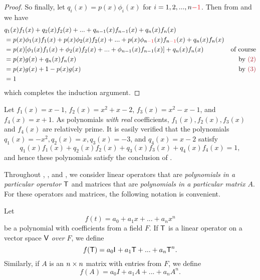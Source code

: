 \begin{proof}
So finally, let \(q_i(x) = p(x)\phi_i(x)\) for \(i= 1, 2, ..., n \RED{- 1}\).
Then from  and  we have
\begin{align*}
    & q_1(x)f_1(x) + q_2(x)f_2(x) + ... + q_{n-1}(x)f_{n-1}(x) + q_n(x)f_n(x) \\
    & = p(x)\phi_1(x)f_1(x) + p(x)\phi_2(x)f_2(x) + ... + p(x)\phi_{n\RED{-1}}(x)f_{n\RED{-1}}(x) + q_n(x)f_n(x) \\
    & = p(x) [\phi_1(x)f_1(x) + \phi_2(x)f_2(x) + ... + \phi_{n-1}(x)f_{n-1}(x)] + q_n(x)f_n(x) & \text{of course} \\
    & = p(x) g(x) + q_n(x)f_n(x) & \text{by \MAROON{(2)}} \\
    & = p(x) g(x) + 1 - p(x)g(x) & \text{by \MAROON{(3)}} \\
    & = 1
\end{align*}
which completes the induction argument.
\end{proof}

\begin{example} \label{example e.1}
Let \(f_1(x) = x - 1\), \(f_2(x) = x^2 + x - 2\), \(f_3(x) = x^2 - x - 1\), and \(f_4(x) = x + 1\).
As polynomials \emph{with real} coefficients, \(f_1(x), f_2(x), f_3(x)\) and \(f_4(x)\) are relatively prime.
It is easily verified that the polynomials \(q_1(x) = -x^2, q_2(x) = x, q_3(x) = -3\), and \(q_4(x) = x - 2\) satisfy
\[
    q_1(x)f_1(x) + q_2(x)f_2(x) + q_3(x)f_3(x) + q_4(x)f_4(x) = 1,
\]
and hence these polynomials satisfy the conclusion of .
\end{example}

Throughout , , and , we consider linear operators that are \emph{polynomials in a particular operator \(\textsf{T}\)} and matrices that are \emph{polynomials in a particular matrix \(A\)}.
For these operators and matrices, the following notation is convenient.

\begin{appendix definition} \label{def e.3}
Let
\[
    f(t) = a_0 + a_1 x + ... + a_n x^n
\]
be a polynomial with coefficients from a field \(F\).
If \(\textsf{T}\) is a linear operator on a vector space \(\textsf{V}\) \emph{over} \(F\), we define
\[
    f(\textsf{T}) = a_0 \textsf{I}_{_{}} + a_1 \textsf{T} + ... + a_n \textsf{T}^n.
\]
Similarly, if \(A\) is an \(n \times n\) matrix with entries from \(F\), we define
\[
    f(A) = a_0 I + a_1 A + ... + a_n A^n.
\]
\end{appendix definition}

